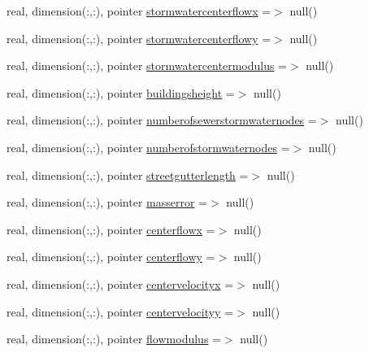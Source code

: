 \begin{DoxyCompactItemize}
\item 
real, dimension(\+:,\+:), pointer \mbox{\hyperlink{structmodulerunoff_1_1t__runoff_ad2ea436413d2ecce4bb5bf550c2781e8}{stormwatercenterflowx}} =$>$ null()
\item 
real, dimension(\+:,\+:), pointer \mbox{\hyperlink{structmodulerunoff_1_1t__runoff_aba7b8d8d26c83e0cdf907cd2763ad3cd}{stormwatercenterflowy}} =$>$ null()
\item 
real, dimension(\+:,\+:), pointer \mbox{\hyperlink{structmodulerunoff_1_1t__runoff_a8fe2271f40562e28ceefc6d3e20f5f8b}{stormwatercentermodulus}} =$>$ null()
\item 
real, dimension(\+:,\+:), pointer \mbox{\hyperlink{structmodulerunoff_1_1t__runoff_acb3924a9190464f6141207806c426370}{buildingsheight}} =$>$ null()
\item 
real, dimension(\+:,\+:), pointer \mbox{\hyperlink{structmodulerunoff_1_1t__runoff_ab9db55c9f940d0ae59c24fb86fce77b7}{numberofsewerstormwaternodes}} =$>$ null()
\item 
real, dimension(\+:,\+:), pointer \mbox{\hyperlink{structmodulerunoff_1_1t__runoff_a9905e6e7044e2f10489d9ae703fe9d4e}{numberofstormwaternodes}} =$>$ null()
\item 
real, dimension(\+:,\+:), pointer \mbox{\hyperlink{structmodulerunoff_1_1t__runoff_afbd43e7be904c3606fbb828bbeca91de}{streetgutterlength}} =$>$ null()
\item 
real, dimension(\+:,\+:), pointer \mbox{\hyperlink{structmodulerunoff_1_1t__runoff_af1808bc7280ee550f9bc3c4d20dd79da}{masserror}} =$>$ null()
\item 
real, dimension(\+:,\+:), pointer \mbox{\hyperlink{structmodulerunoff_1_1t__runoff_a45a75be783c846510ed70a8a63f4d9cd}{centerflowx}} =$>$ null()
\item 
real, dimension(\+:,\+:), pointer \mbox{\hyperlink{structmodulerunoff_1_1t__runoff_ac99c087ab7bed31e0afdc2ef4705fdb3}{centerflowy}} =$>$ null()
\item 
real, dimension(\+:,\+:), pointer \mbox{\hyperlink{structmodulerunoff_1_1t__runoff_a5729566376e27b8ff5fe178a1383f323}{centervelocityx}} =$>$ null()
\item 
real, dimension(\+:,\+:), pointer \mbox{\hyperlink{structmodulerunoff_1_1t__runoff_a7a9c3ab3ef8d32351c67c3f01fcb1665}{centervelocityy}} =$>$ null()
\item 
real, dimension(\+:,\+:), pointer \mbox{\hyperlink{structmodulerunoff_1_1t__runoff_a7af06aaa1cafc7dabc7d6db9d74d07c7}{flowmodulus}} =$>$ null()
\item 

\end{DoxyCompactItemize}
